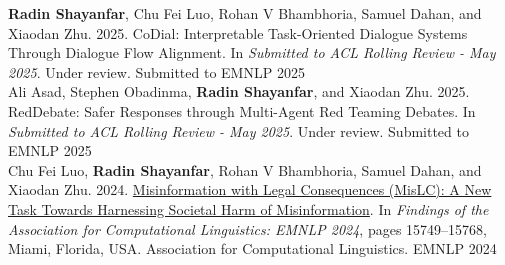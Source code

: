 
\begin{cvhonors}

  \cvpub
    {\textbf{Radin Shayanfar}, Chu Fei Luo, Rohan V Bhambhoria, Samuel Dahan, and Xiaodan Zhu. 2025. CoDial: Interpretable Task-Oriented Dialogue Systems Through Dialogue Flow Alignment. In \textit{Submitted to ACL Rolling Review - May 2025}. Under review.} %
    {Submitted to EMNLP} %
    {2025} %
\\
  \cvpub
    {Ali Asad, Stephen Obadinma, \textbf{Radin Shayanfar}, and Xiaodan Zhu. 2025. RedDebate: Safer Responses through Multi-Agent Red Teaming Debates. In \textit{Submitted to ACL Rolling Review - May 2025}. Under review.} %
    {Submitted to EMNLP} %
    {2025} %
\\
  \cvpub
    {Chu Fei Luo, \textbf{Radin Shayanfar}, Rohan V Bhambhoria, Samuel Dahan, and Xiaodan Zhu. 2024. \href{https://aclanthology.org/2024.findings-emnlp.924/}{Misinformation with Legal Consequences (MisLC): A New Task Towards Harnessing Societal Harm of Misinformation}. In \textit{Findings of the Association for Computational Linguistics: EMNLP 2024}, pages 15749–15768, Miami, Florida, USA. Association for Computational Linguistics.} %
    {EMNLP} %
    {2024} %
\end{cvhonors}





